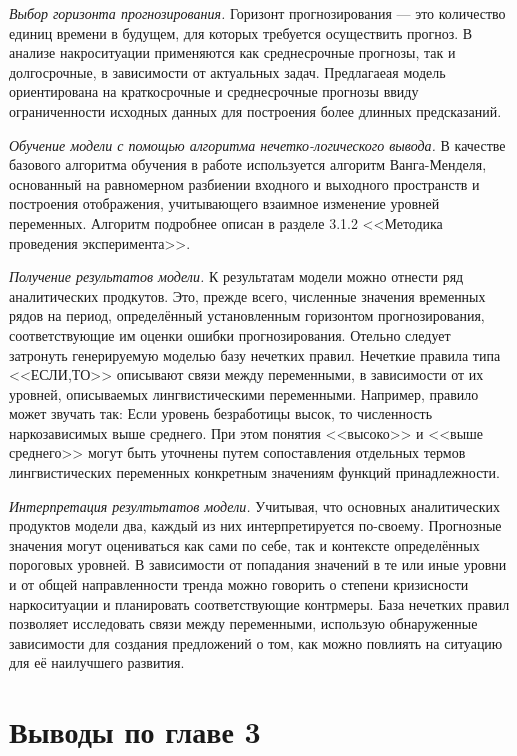 \textit{Выбор горизонта прогнозирования.} Горизонт прогнозирования --- это
количество единиц времени в будущем, для которых требуется осуществить прогноз.
В анализе накроситуации применяются как среднесрочные прогнозы, так и
долгосрочные, в зависимости от актуальных задач.  Предлагаеая модель
ориентирована на краткосрочные и среднесрочные прогнозы ввиду ограниченности
исходных данных для построения более длинных предсказаний.

\textit{Обучение модели с помощью алгоритма нечетко-логического вывода.}
В качестве базового алгоритма обучения в работе используется  алгоритм
Ванга-Менделя, основанный на равномерном разбиении входного и выходного
пространств и построения отображения, учитывающего взаимное изменение уровней
переменных. Алгоритм подробнее описан в разделе 3.1.2 <<Методика проведения
эксперимента>>.

\textit{Получение результатов модели.} К результатам модели можно отнести ряд
аналитических продкутов. Это, прежде всего, численные значения временных рядов
на период, определённый установленным горизонтом прогнозирования,
соответствующие им оценки ошибки прогнозирования. Отельно следует затронуть
генерируемую моделью базу нечетких правил. Нечеткие правила типа <<ЕСЛИ,ТО>>
описывают связи между переменными, в зависимости от их уровней, описываемых
лингвистическими переменными. Например, правило может звучать так: Если уровень
безработицы высок, то численность наркозависимых выше среднего. При этом понятия
<<высоко>> и <<выше среднего>> могут быть уточнены путем сопоставления отдельных
термов лингвистических переменных конкретным значениям функций принадлежности.

\textit{Интерпретация резултьтатов модели.} Учитывая, что основных аналитических
продуктов модели два, каждый из них интерпретируется по-своему. Прогнозные
значения могут оцениваться как сами по себе, так и контексте определённых
пороговых уровней. В зависимости от попадания значений в те или иные уровни и от
общей направленности тренда можно говорить о степени кризисности наркоситуации и
планировать соответствующие контрмеры. База нечетких правил позволяет
исследовать связи между переменными, использую обнаруженные зависимости для
создания предложений о том, как можно повлиять на ситуацию для её наилучшего
развития.

\newpage
\section*{Выводы по главе 3}

